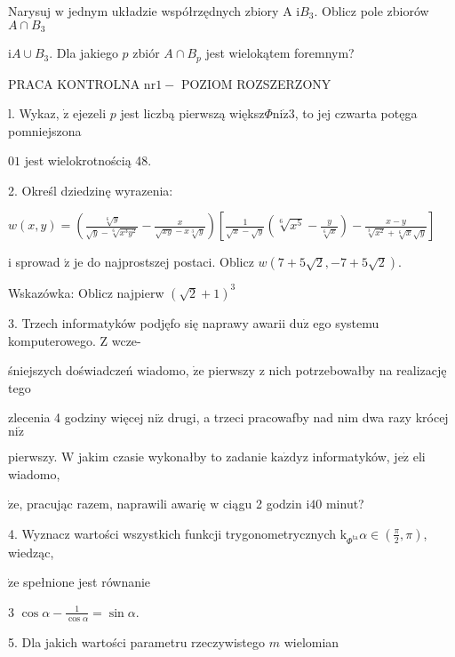 \documentclass[a4paper,12pt]{article}
\begin{document}
Narysuj $\mathrm{w}$ jednym układzie współrzędnych zbiory A $\mathrm{i}B_{3}$. Oblicz pole zbiorów $A\cap B_{3}$

$\mathrm{i} A\cup B_{3}$. Dla jakiego $p$ zbiór $A\cap B_{p}$ jest wielokątem foremnym?




PRACA KONTROLNA $\mathrm{n}\mathrm{r} 1 -$ POZIOM ROZSZERZONY

l. Wykaz, $\dot{\mathrm{z}}$ ejezeli $p$ jest liczbą pierwszą większ$\Phi \mathrm{n}\mathrm{i}\dot{\mathrm{z}}3$, to jej czwarta potęga pomniejszona

$01$ jest wielokrotnością 48.

2. Określ dziedzinę wyrazenia:

$w(x,y)=(\displaystyle \frac{\sqrt[6]{y}}{\sqrt{y}-\sqrt[6]{x^{3}y^{2}}}-\frac{x}{\sqrt{xy}-x\sqrt[3]{y}})[\frac{1}{\sqrt{x}-\sqrt{y}}(\sqrt[6]{x^{5}}-\frac{y}{\sqrt[6]{x}})-\frac{x-y}{\sqrt[3]{x^{2}}+\sqrt[6]{x}\sqrt{y}}]$

$\mathrm{i}$ sprowad $\acute{\mathrm{z}}$ je do najprostszej postaci. Oblicz $w(7+5\sqrt{2},-7+5\sqrt{2}).$

Wskazówka: Oblicz najpierw $(\sqrt{2}+1)^{3}$

3. Trzech informatyków podjęfo się naprawy awarii $\mathrm{d}\mathrm{u}\dot{\mathrm{z}}$ ego systemu komputerowego. $\mathrm{Z}$ wcze-

śniejszych doświadczeń wiadomo, $\dot{\mathrm{z}}\mathrm{e}$ pierwszy $\mathrm{z}$ nich potrzebowałby na realizację tego

zlecenia 4 godziny więcej $\mathrm{n}\mathrm{i}\dot{\mathrm{z}}$ drugi, a trzeci pracowafby nad nim dwa razy krócej $\mathrm{n}\mathrm{i}\dot{\mathrm{z}}$

pierwszy. $\mathrm{W}$ jakim czasie wykonałby to zadanie $\mathrm{k}\mathrm{a}\dot{\mathrm{z}}\mathrm{d}\mathrm{y}\mathrm{z}$ informatyków, $\mathrm{j}\mathrm{e}\dot{\mathrm{z}}$ eli wiadomo,

$\dot{\mathrm{z}}\mathrm{e}$, pracując razem, naprawili awarię $\mathrm{w}$ ciągu 2 godzin $\mathrm{i}40$ minut?

4. Wyznacz wartości wszystkich funkcji trygonometrycznych $\mathrm{k}_{\Phi^{\mathrm{t}\mathrm{a}}}\alpha \in (\displaystyle \frac{\pi}{2},\pi)$, wiedząc,

$\dot{\mathrm{z}}\mathrm{e}$ spełnione jest równanie

3 $\displaystyle \cos\alpha-\frac{1}{\cos\alpha}=\sin\alpha.$

5. Dla jakich wartości parametru rzeczywistego $m$ wielomian
\end{document}
